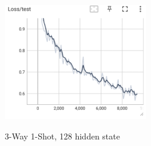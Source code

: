 \documentclass[12pt]{article}
\begin{document}
\begin{figure}[htbp]
\begin{minipage}{0.4\linewidth}
		\includegraphics[width=0.9\linewidth]{./figures/3w1s_test_loss.png}
		\label{pic three}%
	\end{minipage}
    \caption{3-Way 1-Shot, 128 hidden state}
    \label{3w1s}
    \end{figure}
\end{document}
